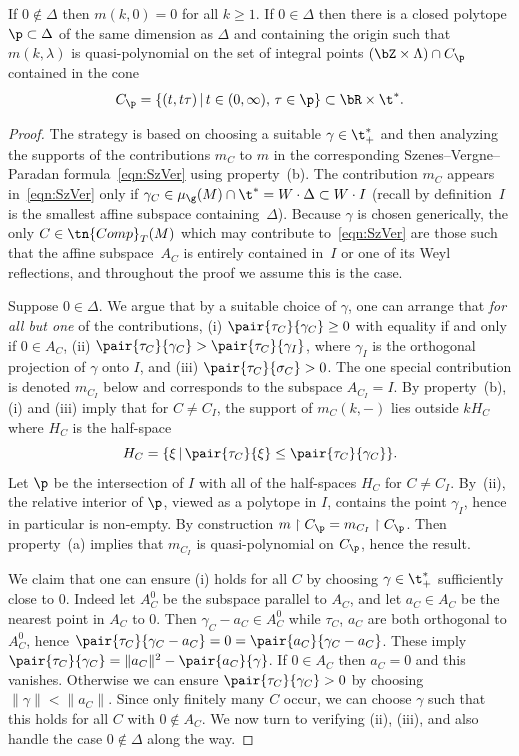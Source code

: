 \begin{Theorem}\label{thm:qp}
If $0 \notin \Delta$ then $m(k,0)=0$ for all $k \ge 1$. If $0 \in \Delta$ then there is a closed polytope $\p \subset \Delta$ of the same dimension as $\Delta$ and containing the origin such that $m(k,\lambda)$ is quasi-polynomial on the set of integral points $(\bZ \times \Lambda) \cap C_\p$ contained in the cone
\[ C_\p=\{(t,t\tau)\,|\,t \in (0,\infty), \,\tau \in \p \} \subset \bR \times \t^\ast.\]
\end{Theorem}
\begin{proof}The strategy is based on choosing a suitable $\gamma \in \t^\ast_+$ and then analyzing the supports of the contributions $m_C$ to $m$ in the corresponding Szenes--Vergne--Paradan formula~\eqref{eqn:SzVer} using property~(b). The contribution $m_C$ appears in~\eqref{eqn:SzVer} only if $\gamma_C \in \mu_\g(M)\cap \t^\ast=W \cdot \Delta \subset W \cdot I$ (recall by definition~$I$ is the smallest affine subspace containing~$\Delta$). Because $\gamma$ is chosen generically, the only $C \in \tn{Comp}_T(M)$ which may contribute to~\eqref{eqn:SzVer} are those such that the affine subspace~$A_C$ is entirely contained in~$I$ or one of its Weyl reflections, and throughout the proof we assume this is the case.

Suppose $0 \in \Delta$. We argue that by a suitable choice of $\gamma$, one can arrange that \emph{for all but one} of the contributions, (i) $\pair{\tau_C}{\gamma_C}\ge 0$ with equality if and only if $0 \in A_C$, (ii) $\pair{\tau_C}{\gamma_C}>\pair{\tau_C}{\gamma_I}$, where $\gamma_I$ is the orthogonal projection of $\gamma$ onto $I$, and (iii) $\pair{\tau_C}{\sigma_C}>0$. The one special contribution is denoted $m_{C_I}$ below and corresponds to the subspace $A_{C_I}=I$. By property~(b), (i) and (iii) imply that for $C \ne C_I$, the support of $m_C(k,-)$ lies outside $kH_C$ where $H_C$ is the half-space
\[ H_C=\{\xi \,|\, \pair{\tau_C}{\xi}\le \pair{\tau_C}{\gamma_C}\}.\]
Let $\p$ be the intersection of $I$ with all of the half-spaces $H_C$ for $C \ne C_I$. By~(ii), the relative interior of $\p$, viewed as a polytope in $I$, contains the point $\gamma_I$, hence in particular is non-empty. By construction $m\upharpoonright C_\p=m_{C_I}\upharpoonright C_\p$. Then property~(a) implies that $m_{C_I}$ is quasi-polynomial on $C_\p$, hence the result.

We claim that one can ensure (i) holds for all $C$ by choosing $\gamma \in \t^\ast_+$ sufficiently close to $0$. Indeed let $A_C^0$ be the subspace parallel to $A_C$, and let $a_C \in A_C$ be the nearest point in $A_C$ to $0$. Then $\gamma_C-a_C \in A_C^0$ while $\tau_C$, $a_C$ are both orthogonal to $A_C^0$, hence $\pair{\tau_C}{\gamma_C-a_C}=0=\pair{a_C}{\gamma_C-a_C}$. These imply $\pair{\tau_C}{\gamma_C}=\|a_C\|^2-\pair{a_C}{\gamma}$. If $0 \in A_C$ then $a_C=0$ and this vanishes. Otherwise we can ensure $\pair{\tau_C}{\gamma_C}>0$ by choosing $\|\gamma\|<\|a_C\|$. Since only finitely many $C$ occur, we can choose $\gamma$ such that this holds for all $C$ with $0 \notin A_C$. We now turn to verifying (ii), (iii), and also handle the case $0 \notin \Delta$ along the way.


\end{proof}
